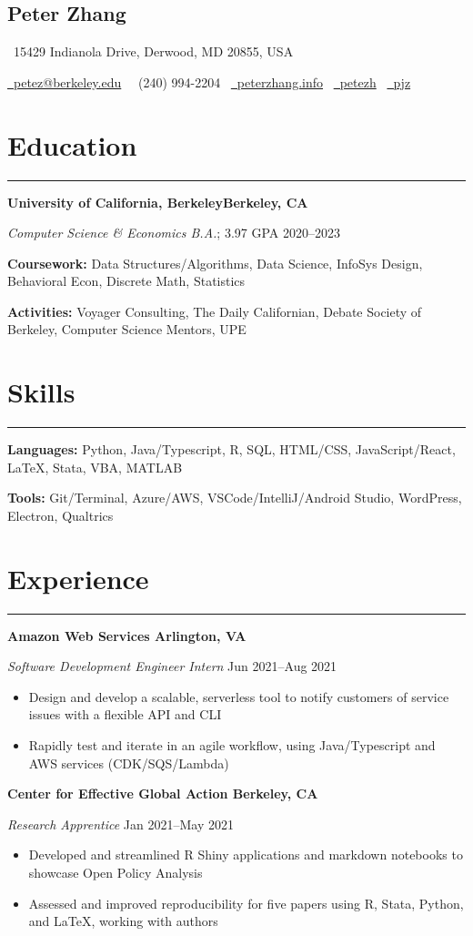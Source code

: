 \documentclass[11pt]{article}
\newcommand{\name}[1]{\begin{center}\section*{\huge \color{highlight} #1}\vspace{-0.5cm}\end{center}}
\newcommand{\topinfo}[1]{\begin{center}\vspace{-0.2cm}#1\vspace{-0.2cm}\end{center}}
\newcommand{\resumesection}[1]{\vspace{-0.6cm}\section*{\color{highlight}#1}\vspace{-0.3cm}\hrule\vspace{0.2cm}}
\begin{document}
\name{Peter Zhang}
\topinfo{\faHome \ 15429 Indianola Drive, Derwood, MD 20855, USA}
\topinfo{\href{mailto:petez@berkeley.edu}{\faEnvelope \ petez@berkeley.edu} \ \faPhone \ (240) 994-2204 \ \href{https://peterzhang.info/}{\faBriefcase \ peterzhang.info} \  \href{https://github.com/petezh}{\faGithub \ petezh} \  \href{https://www.linkedin.com/in/pjz/}{\faLinkedinSquare \ pjz}}

\resumesection{Education}

\textbf{University of California, Berkeley\hfill Berkeley, CA} \par
\textit{Computer Science \& Economics B.A.}; 3.97 GPA \hfill 2020--2023\par
\textbf{Coursework:} Data Structures/Algorithms, Data Science, InfoSys Design, Behavioral Econ, Discrete Math, Statistics\par
\textbf{Activities:} Voyager Consulting, The Daily Californian, Debate Society of Berkeley, Computer Science Mentors, UPE

\resumesection{Skills}

\textbf{Languages:} Python, Java/Typescript, R, SQL, HTML/CSS, JavaScript/React, \LaTeX, Stata, VBA, MATLAB \par
\textbf{Tools:} Git/Terminal, Azure/AWS, VSCode/IntelliJ/Android Studio, WordPress, Electron, Qualtrics
\resumesection{Experience}

\textbf{Amazon Web Services \hfill Arlington, VA}\par

\textit{Software Development Engineer Intern} \hfill Jun 2021--Aug 2021
\begin{itemize}
	\item Design and develop a scalable, serverless tool to notify customers of service issues with a flexible API and CLI
	\item Rapidly test and iterate in an agile workflow, using Java/Typescript and AWS services (CDK/SQS/Lambda)
\end{itemize}\par

\textbf{Center for Effective Global Action \hfill Berkeley, CA}\par

\textit{Research Apprentice} \hfill Jan 2021--May 2021
\begin{itemize}
	\item Developed and streamlined R Shiny applications and markdown notebooks to showcase Open Policy Analysis
	\item Assessed and improved reproducibility for five papers using R, Stata, Python, and \LaTeX, working with authors
\end{itemize}\par
\end{document}
